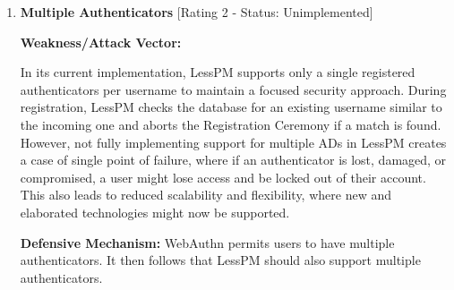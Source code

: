 \begin{enumerate}[label=$\blacktriangleright$]
  \item \textbf{Multiple Authenticators} [Rating 2 - Status: Unimplemented]
  
  \textbf{Weakness/Attack Vector:}

  In its current implementation, LessPM supports only a single registered
  authenticators per username to maintain a focused security approach.
  During registration, LessPM checks the database for an existing username
  similar to the incoming one and aborts the Registration Ceremony if a match
  is found.
  However, not fully implementing support for multiple ADs in LessPM creates
  a case of single point of failure, where if an authenticator is lost,
  damaged, or compromised, a user might lose access and be locked out of
  their account.
  This also leads to reduced scalability and flexibility, where new and
  elaborated technologies might now be supported.
  
  \textbf{Defensive Mechanism:}
  WebAuthn permits users to have multiple authenticators.
  It then follows that LessPM should also support multiple authenticators.

\end{enumerate}
